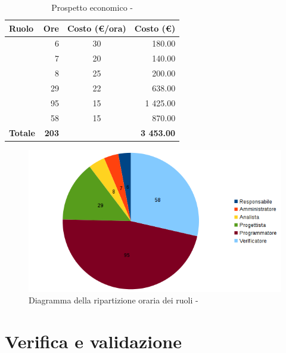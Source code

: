 \documentclass[12pt,a4paper]{article}
\begin{document}
\begin{table}[H]
	\begin{center}
		\begin{tabular}{l r c r}
			\toprule
			\textbf{Ruolo}	& \textbf{Ore} & \textbf{Costo (\euro/ora)}	& \textbf{Costo (\euro)} \\ \midrule
			\midrule
			\RE & 6 & 30 & 180.00 \\ \midrule
			\AM & 7 & 20 & 140.00 \\ \midrule
			\AN & 8 & 25 & 200.00 \\ \midrule
			\PG & 29 & 22 & 638.00 \\ \midrule
			\PR & 95 & 15 & 1 425.00 \\ \midrule
			\VR & 58 & 15 & 870.00 \\ \midrule
			\textbf{Totale} & \textbf{203} &  & \textbf{3 453.00} \\
			\bottomrule
		\end{tabular}
		\caption{Prospetto economico - \FPDC}
	\end{center}
\end{table}

\begin{center}
	\begin{figure}[H]
		\centering
		\includegraphics[width=\textwidth]{diagrammaTortaProgettazioneDettaglioCodificaTotaleOre.png}
		\caption{Diagramma della ripartizione oraria dei ruoli - \FPDC}
	\end{figure}
\end{center}

\newpage
\section{Verifica e validazione} %
\end{document}
